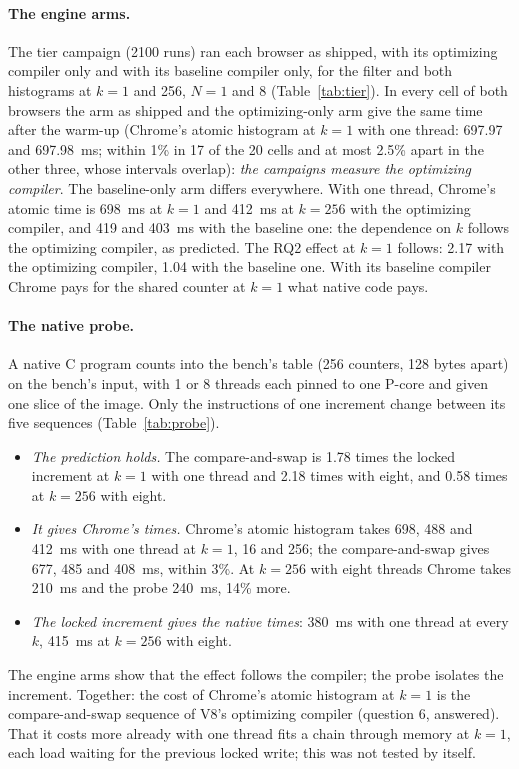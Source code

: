 \paragraph{The engine arms.} The tier campaign (2100 runs) ran each browser
as shipped, with its optimizing compiler only and with its baseline
compiler only, for the filter and both histograms at $k=1$ and 256, $N=1$
and 8 (Table~\ref{tab:tier}). In every cell of both browsers the arm as
shipped and the optimizing-only arm give the same time after the warm-up
(Chrome's atomic histogram at $k=1$ with one thread: 697.97 and 697.98~ms;
within 1\% in 17 of the 20 cells and at most 2.5\% apart in the other
three, whose intervals overlap): \emph{the campaigns measure the optimizing
compiler}. The baseline-only arm
differs everywhere. With one thread, Chrome's atomic time is 698~ms at
$k=1$ and 412~ms at $k=256$ with the optimizing compiler, and 419 and
403~ms with the baseline one: the dependence on $k$ follows the optimizing
compiler, as predicted. The RQ2 effect at $k=1$ follows: 2.17 with the
optimizing compiler, 1.04 with the baseline one. With its baseline compiler
Chrome pays for the shared counter at $k=1$ what native code pays.



\paragraph{The native probe.} A native C program counts into the bench's
table (256 counters, 128 bytes apart) on the bench's input, with 1 or 8
threads each pinned to one P-core and given one slice of the image. Only
the instructions of one increment change between its five sequences
(Table~\ref{tab:probe}).



\begin{itemize}[leftmargin=1.5em]
\item \emph{The prediction holds.} The compare-and-swap is 1.78 times the
locked increment at $k=1$ with one thread and 2.18 times with eight, and
0.58 times at $k=256$ with eight.
\item \emph{It gives Chrome's times.} Chrome's atomic histogram takes 698,
488 and 412~ms with one thread at $k=1$, 16 and 256; the compare-and-swap
gives 677, 485 and 408~ms, within 3\%. At $k=256$ with eight threads Chrome
takes 210~ms and the probe 240~ms, 14\% more.
\item \emph{The locked increment gives the native times}: 380~ms with one
thread at every $k$, 415~ms at $k=256$ with eight.
\end{itemize}
The engine arms show that the effect follows the compiler; the probe
isolates the increment. Together: the cost of Chrome's atomic histogram at
$k=1$ is the compare-and-swap sequence of V8's optimizing compiler
(question 6, answered). That it costs more already with one thread fits a
chain through memory at $k=1$, each load waiting for the previous locked
write; this was not tested by itself.

